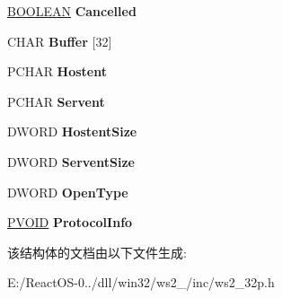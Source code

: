 \begin{DoxyCompactItemize}
\mbox{\label{struct___w_s_t_h_r_e_a_d_af277e2ed3c7b158d423e40fa993ddebb}} 
\hyperlink{_processor_bind_8h_a112e3146cb38b6ee95e64d85842e380a}{B\+O\+O\+L\+E\+AN} {\bfseries Cancelled}
\item 
\mbox{\label{struct___w_s_t_h_r_e_a_d_a31cebd5b793bc839172fe617a1655c76}} 
C\+H\+AR {\bfseries Buffer} \mbox{[}32\mbox{]}
\item 
\mbox{\label{struct___w_s_t_h_r_e_a_d_a56440c5841dbba39672a7b7b5c2cd116}} 
P\+C\+H\+AR {\bfseries Hostent}
\item 
\mbox{\label{struct___w_s_t_h_r_e_a_d_a5aa0ac8b33ac3c1df33e51db5c2a79af}} 
P\+C\+H\+AR {\bfseries Servent}
\item 
\mbox{\label{struct___w_s_t_h_r_e_a_d_aa5e4341761ab9d2cb4da5b64a80bb5cb}} 
D\+W\+O\+RD {\bfseries Hostent\+Size}
\item 
\mbox{\label{struct___w_s_t_h_r_e_a_d_a16f3a22698d7429059f227ea1970027c}} 
D\+W\+O\+RD {\bfseries Servent\+Size}
\item 
\mbox{\label{struct___w_s_t_h_r_e_a_d_ab68dda7257c18ad2523c9a458cbab18d}} 
D\+W\+O\+RD {\bfseries Open\+Type}
\item 
\mbox{\label{struct___w_s_t_h_r_e_a_d_a8b6687f76a50dbaf2244f1dc251bcdf7}} 
\hyperlink{interfacevoid}{P\+V\+O\+ID} {\bfseries Protocol\+Info}
\end{DoxyCompactItemize}


该结构体的文档由以下文件生成\+:\begin{DoxyCompactItemize}
\item 
E\+:/\+React\+O\+S-\/0../dll/win32/ws2\+\_/inc/ws2\+\_\+32p.\+h\end{DoxyCompactItemize}
